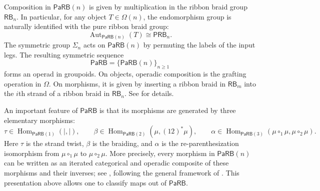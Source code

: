 \documentclass{amsart}
\newcommand{\PaRB}{\mathsf{PaRB}}
\newcommand{\Hom}{\operatorname{Hom}}
\newcommand{\Aut}{\operatorname{Aut}}
\newcommand{\RB}{\mathsf{RB}} %
\newcommand{\PRB}{\mathsf{PRB}} %
\theoremstyle{definition}
\numberwithin{equation}{section}
\begin{document}
Composition in $\PaRB(n)$ is given by multiplication in the ribbon braid group $\RB_n$. In particular, for any object $T\in\Omega(n)$, the endomorphism group is naturally identified with the pure ribbon braid group:
\[
\Aut_{\PaRB(n)}(T)\cong \PRB_n.
\] The symmetric group $\Sigma_n$ acts on $\PaRB(n)$ by permuting the labels of the input legs. The resulting symmetric sequence
\[
\PaRB=\{\PaRB(n)\}_{n\geq 1}
\] forms an operad in groupoids. On objects, operadic composition is the grafting operation in $\Omega$. On morphisms, it is given by inserting a ribbon braid in $\RB_m$ into the $i$th strand of a ribbon braid in $\RB_n$. See \cite[Definition~6.11]{Boavida-Horel-Robertson} for details.

\medskip
An important feature of $\PaRB$ is that its morphisms are generated by three elementary morphisms:
\[
\tau\in\Hom_{\PaRB(1)}(\mid,\mid),\qquad
\beta\in\Hom_{\PaRB(2)}(\mu,(12)^*\mu),
\qquad
\alpha\in\Hom_{\PaRB(3)}(\mu\circ_1\mu,\mu\circ_2\mu).
\]
Here $\tau$ is the strand twist, $\beta$ is the braiding, and $\alpha$ is the re-parenthesization isomorphism from $\mu\circ_1\mu$ to $\mu\circ_2\mu$. More precisely, every morphism in $\PaRB(n)$ can be written as an iterated categorical and operadic composite of these morphisms and their inverses; see \cite[Section~7]{Boavida-Horel-Robertson}, following the general framework of \cite[Chapter~6]{FresseBook1}.  This presentation above allows one to classify maps out of $\PaRB$. 
\end{document}
